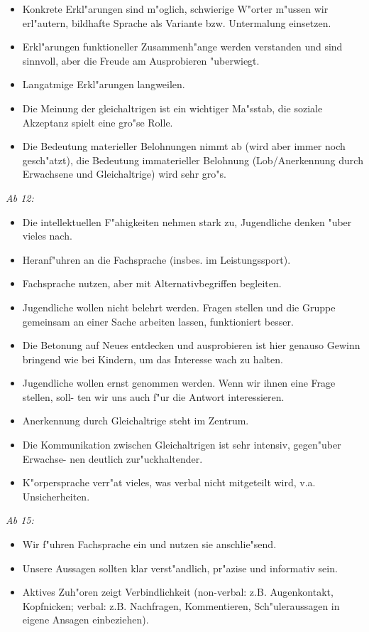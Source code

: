 \begin{solution}
\begin{itemize}
\item Konkrete Erkl"arungen sind m"oglich, schwierige W"orter m"ussen wir erl"autern, bildhafte Sprache als Variante bzw. Untermalung einsetzen.
\item Erkl"arungen funktioneller Zusammenh"ange werden verstanden und sind sinnvoll, aber die Freude am Ausprobieren "uberwiegt.
\item Langatmige Erkl"arungen langweilen.
\item Die Meinung der gleichaltrigen ist ein wichtiger Ma"sstab, die soziale Akzeptanz spielt eine gro"se Rolle.
\item Die Bedeutung materieller Belohnungen nimmt ab (wird aber immer noch gesch"atzt), die Bedeutung immaterieller Belohnung (Lob/Anerkennung durch Erwachsene und Gleichaltrige) wird sehr gro"s.
\end{itemize}
\emph{Ab 12:}
\begin{itemize}
\item Die intellektuellen F"ahigkeiten nehmen stark zu, Jugendliche denken "uber vieles nach.
\item Heranf"uhren an die Fachsprache (insbes. im Leistungssport).
\item Fachsprache nutzen, aber mit Alternativbegriffen begleiten.
\item Jugendliche wollen nicht belehrt werden. Fragen stellen und die Gruppe gemeinsam an einer Sache arbeiten lassen, funktioniert besser.
\item Die Betonung auf Neues entdecken und ausprobieren ist hier genauso Gewinn bringend wie bei Kindern, um das Interesse wach zu halten.
\item Jugendliche wollen ernst genommen werden. Wenn wir ihnen eine Frage stellen, soll-
ten wir uns auch f"ur die Antwort interessieren.
\item Anerkennung durch Gleichaltrige steht im Zentrum.
\item Die Kommunikation zwischen Gleichaltrigen ist sehr intensiv, gegen"uber Erwachse-
nen deutlich zur"uckhaltender.
\item K"orpersprache verr"at vieles, was verbal nicht mitgeteilt wird, v.a. Unsicherheiten.
\end{itemize}
\emph{Ab 15:}
\begin{itemize}
\item Wir f"uhren Fachsprache ein und nutzen sie anschlie"send.
\item Unsere Aussagen sollten klar verst"andlich, pr"azise und informativ sein.
\item Aktives Zuh"oren zeigt Verbindlichkeit (non-verbal: z.B. Augenkontakt, Kopfnicken; verbal: z.B. Nachfragen, Kommentieren, Sch"uleraussagen in eigene Ansagen einbeziehen).

\end{itemize}
\end{solution}
